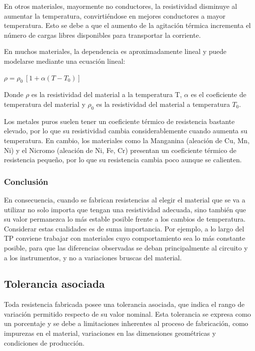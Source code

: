 En otros materiales, mayormente no conductores, la resistividad disminuye al aumentar la temperatura, convirtiéndose en mejores conductores a mayor temperatura. Esto se debe a que el aumento de la agitación térmica incrementa el número de cargas libres disponibles para transportar la corriente.


En muchos materiales, la dependencia es aproximadamente lineal y puede modelarse mediante una ecuación lineal:

$\rho= \rho_0 ~[1+\alpha(T-T_0)]$

Donde $\rho$ es la resistividad del material a la temperatura T, $\alpha$ es el coeficiente de temperatura del material y $\rho_0$ es la resistividad del material a temperatura $T_0$.

 Los metales puros suelen tener un coeficiente térmico de resistencia bastante elevado, por lo que su resistividad cambia considerablemente cuando aumenta su temperatura. En cambio, los materiales como la Manganina (aleación de Cu, Mn, Ni) y el Nicromo (aleación de Ni, Fe, Cr) presentan un coeficiente térmico de resistencia pequeño, por lo que su resistencia cambia poco aunque se calienten.
 
 \subsubsection{Conclusión}

En consecuencia, cuando se fabrican resistencias al elegir el material que se va a utilizar no solo importa que tengan una resistividad adecuada, sino también que su valor permanezca lo más estable posible frente a los cambios de temperatura. Considerar estas cualidades es de suma importancia. Por ejemplo, a lo largo del TP conviene trabajar con materiales cuyo comportamiento sea lo más constante posible, para que las diferencias observadas se deban principalmente al circuito y a los instrumentos, y no a variaciones bruscas del material.


\subsection{Tolerancia asociada}
Toda resistencia fabricada posee una tolerancia asociada, que indica el rango de variación permitido respecto de su valor nominal. Esta tolerancia se expresa como un porcentaje y se debe a limitaciones inherentes al proceso de fabricación, como impurezas en el material, variaciones en las dimensiones geométricas y condiciones de producción.

